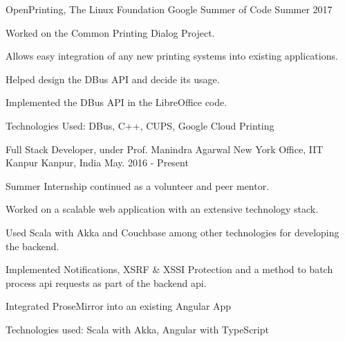 \begin{cventries}

  \cventry
  {OpenPrinting, The Linux Foundation}
  {Google Summer of Code}
  {}
  {Summer 2017}
  {
    \begin{cvitems}
      \item Worked on the Common Printing Dialog Project.
      \item Allows easy integration of any new printing systems into existing applications.
      \item Helped design the DBus API and decide its usage.
      \item Implemented the DBus API in the LibreOffice code.
      \item Technologies Used: DBus, C++, CUPS, Google Cloud Printing
    \end{cvitems}
  }

  \cventry
  {Full Stack Developer, under Prof. Manindra Agarwal}
  {New York Office, IIT Kanpur}
  {Kanpur, India}
  {May. 2016 - Present}
  {
    \begin{cvitems}
      \item Summer Internship continued as a volunteer and peer mentor.
      \item Worked on a scalable web application with an extensive technology stack.
      \item Used Scala with Akka and Couchbase among other technologies for
        developing the backend.
      \item	Implemented Notifications, XSRF \& XSSI Protection and a method
        to batch process api requests as part of the backend api.
      \item Integrated ProseMirror into an existing Angular App
      \item Technologies used: Scala with Akka, Angular with TypeScript
    \end{cvitems}
  }

\end{cventries}